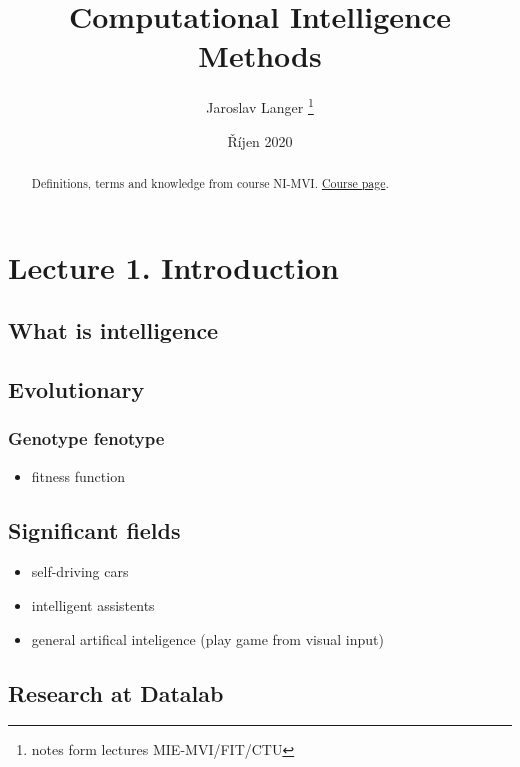 \documentclass[12pt, letterpaper, twoside]{article}
\title{Computational Intelligence Methods}
\author{Jaroslav Langer \thanks{notes form lectures MIE-MVI/FIT/CTU}}
\date{Říjen 2020}
\begin{document}
\maketitle

\tableofcontents

\begin{abstract}
Definitions, terms and knowledge from course NI-MVI. \href{https://courses.fit.cvut.cz/MIE-MVI/}{Course page}.
\end{abstract}

\section{Lecture 1. Introduction}

\subsection*{}

\subsection*{What is intelligence}

\subsection*{Evolutionary}

\subsubsection*{Genotype fenotype}

\begin{itemize}
    \item fitness function
\end{itemize}

\subsection*{Significant fields}

\begin{itemize}
    \item self-driving cars
    \item intelligent assistents
    \item general artifical inteligence (play game from visual input)
\end{itemize}

\subsection*{Research at Datalab}
\end{document}
